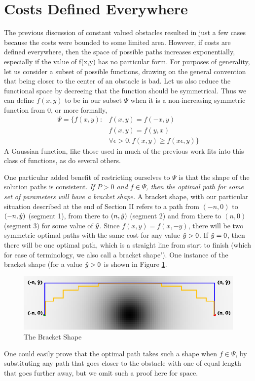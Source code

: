 \section{Costs Defined Everywhere}
The previous discussion of constant valued obstacles resulted in just a few cases because the costs were bounded to some limited area. However, if costs are defined everywhere, then the space of possible paths increases exponentially, especially if the value of f(x,y) has no particular form. For purposes of generality, let us consider a subset of possible functions, drawing on the general convention that being closer to the center of an obstacle is bad. Let us also reduce the functional space by decreeing that the function should be symmetrical. Thus we can define $f(x,y)$ to be in our subset $\Psi$ when it is a non-increasing symmetric function from 0, or more formally, 
\begin{align*}
\Psi = \{ f(x,y) : & f(x,y)=f(-x,y)\\
 & f(x,y)=f(y,x) \\
 & \forall \epsilon>0, f(x,y) \ge f(x\epsilon, y) \}
\end{align*}
 A Gaussian function, like those used in much of the previous work fits into this class of functions, as do several others. 

One particular added benefit of restricting ourselves to $\Psi$ is that the shape of the solution paths is consistent. \emph{If $P>0$ and $f\in\Psi$, then the optimal path for some set of parameters will have a bracket shape.} A bracket shape, with our particular situation described at the end of Section II refers to a path from $(-n,0)$ to $(-n, \hat{y})$ (segment 1), from there to $(n, \hat{y})$ (segment 2) and from there to $(n,0)$ (segment 3) for some value of $\hat{y}$. Since $f(x,y)=f(x,-y)$, there will be two symmetric optimal paths with the same cost for any value $\hat{y}>0$. If $\hat{y}=0$, then there will be one optimal path, which is a straight line from start to finish (which for ease of terminology, we also call a bracket shape'). One instance of the bracket shape (for a value $\hat{y} > 0 $ is shown in Figure \ref{fig:bracket}. 

\begin{figure}
\includegraphics[width=\columnwidth]{graphix/bracket.png}
\caption{The Bracket Shape}
\label{fig:bracket}
\end{figure}

One could easily prove that the optimal path takes such a shape when $f\in\Psi$, by substituting any path that goes closer to the obstacle with one of equal length that goes further away, but we omit such a proof here for space. 


